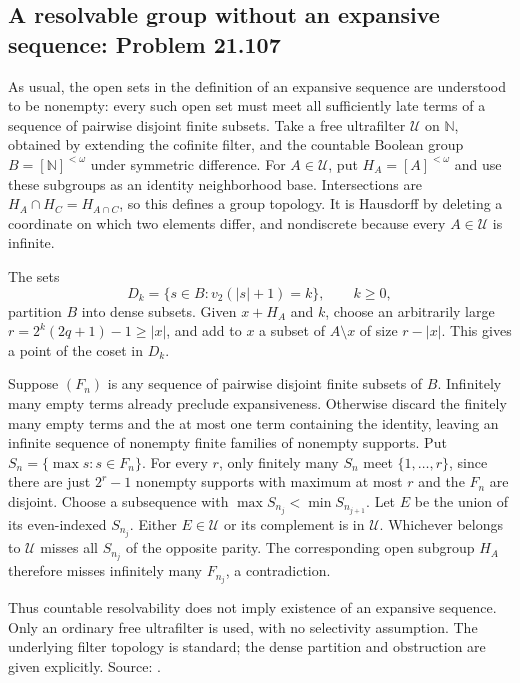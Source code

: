 \subsection{A resolvable group without an expansive sequence: Problem 21.107}
\label{cand:21.107}

As usual, the open sets in the definition of an expansive
sequence are understood to be nonempty: every such open
set must meet all sufficiently late terms of a sequence
of pairwise disjoint finite subsets.
Take a free ultrafilter \(\mathcal U\) on \(\mathbb N\),
obtained by extending the cofinite filter, and the countable
Boolean group \(B=[\mathbb N]^{<\omega}\) under symmetric
difference. For \(A\in\mathcal U\), put
\(H_A=[A]^{<\omega}\) and use these subgroups as an
identity neighborhood base. Intersections are
\(H_A\cap H_C=H_{A\cap C}\), so this defines a group
topology. It is Hausdorff by deleting a coordinate
on which two elements differ, and nondiscrete because
every \(A\in\mathcal U\) is infinite.

The sets
\[
 D_k=\{s\in B:v_2(|s|+1)=k\},\qquad k\geq0,
\]
partition \(B\) into dense subsets. Given \(x+H_A\)
and \(k\), choose an arbitrarily large
\(r=2^k(2q+1)-1\geq|x|\), and add to \(x\) a
subset of \(A\setminus x\) of size \(r-|x|\).
This gives a point of the coset in \(D_k\).

Suppose \((F_n)\) is any sequence of pairwise disjoint
finite subsets of \(B\). Infinitely many empty terms
already preclude expansiveness. Otherwise discard
the finitely many empty terms and the at most one
term containing the identity, leaving an infinite
sequence of nonempty finite families of nonempty
supports. Put \(S_n=\{\max s:s\in F_n\}\).
For every \(r\), only finitely many \(S_n\) meet
\(\{1,\ldots,r\}\), since there are just \(2^r-1\)
nonempty supports with maximum at most \(r\) and
the \(F_n\) are disjoint.
Choose a subsequence with
\(\max S_{n_j}<\min S_{n_{j+1}}\).
Let \(E\) be the union of its even-indexed \(S_{n_j}\).
Either \(E\in\mathcal U\) or its complement is in
\(\mathcal U\). Whichever belongs to \(\mathcal U\)
misses all \(S_{n_j}\) of the opposite parity.
The corresponding open subgroup \(H_A\) therefore
misses infinitely many \(F_{n_j}\), a contradiction.

Thus countable resolvability does not imply existence
of an expansive sequence. Only an ordinary free
ultrafilter is used, with no selectivity assumption.
The underlying filter topology is standard; the
dense partition and obstruction are given explicitly.
Source: .

